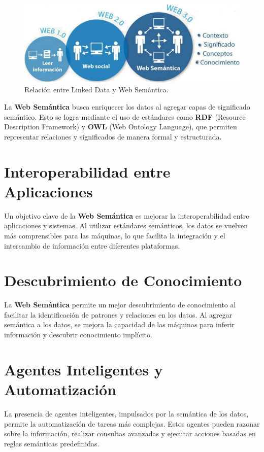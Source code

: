 \documentclass[11pt]{report}
\begin{document}
	\begin{figure}[H]
		\centering
		\includegraphics[scale=0.4]{../img/websemantica.jpg}
		\caption{Relación entre Linked Data y Web Semántica.}
		\label{fig:websemantica}
	\end{figure}

	La \textbf{Web Semántica} busca enriquecer los datos al agregar capas de significado semántico. Esto se logra mediante el uso de estándares como \textbf{RDF} (Resource Description Framework) y \textbf{OWL} (Web Ontology Language), que permiten representar relaciones y significados de manera formal y estructurada.

	\section{Interoperabilidad entre Aplicaciones}

	Un objetivo clave de la \textbf{Web Semántica} es mejorar la interoperabilidad entre aplicaciones y sistemas. Al utilizar estándares semánticos, los datos se vuelven más comprensibles para las máquinas, lo que facilita la integración y el intercambio de información entre diferentes plataformas.

	\section{Descubrimiento de Conocimiento}

	La \textbf{Web Semántica} permite un mejor descubrimiento de conocimiento al facilitar la identificación de patrones y relaciones en los datos. Al agregar semántica a los datos, se mejora la capacidad de las máquinas para inferir información y descubrir conocimiento implícito.

	\section{Agentes Inteligentes y Automatización}

	La presencia de agentes inteligentes, impulsados por la semántica de los datos, permite la automatización de tareas más complejas. Estos agentes pueden razonar sobre la información, realizar consultas avanzadas y ejecutar acciones basadas en reglas semánticas predefinidas.
\end{document}
